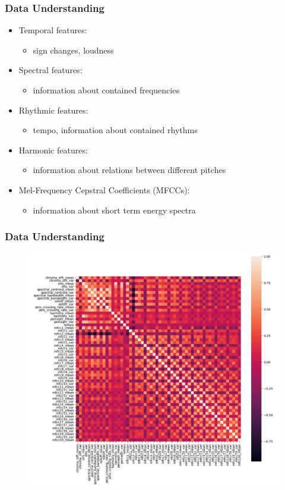 \documentclass[10pt, aspectratio=169]{beamer}
\begin{document}
\begin{frame}
    \frametitle{Data Understanding}
    \begin{itemize}\setlength\itemsep{12pt}
        \item Temporal features: \begin{itemize}
            \item sign changes, loudness
        \end{itemize}
        \item Spectral features: \begin{itemize}
            \item information about contained frequencies
        \end{itemize}
        \item Rhythmic features: \begin{itemize}
            \item tempo, information about contained rhythms
        \end{itemize}
        \item Harmonic features: \begin{itemize}
            \item information about relations between different pitches
        \end{itemize}
        \item Mel-Frequency Cepstral Coefficients (MFCCs): \begin{itemize}
            \item information about short term energy spectra
        \end{itemize}
    \end{itemize}
\end{frame}

\begin{frame}
    \frametitle{Data Understanding}
    \begin{figure}
        \centering
        \includegraphics[width=0.65\linewidth]{img/Heatmap.jpg}
    \end{figure}
\end{frame}
\end{document}
